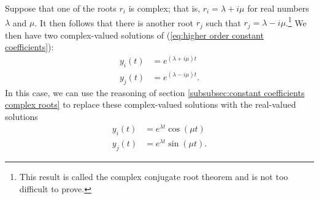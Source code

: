 \documentclass{myart}
\newcommand{\eq}[1]{(\ref{eq:#1})}
\begin{document}
Suppose that one of the roots $r_i$ is complex; that is, $r_i =
\lambda + i \mu$ for real numbers $\lambda$ and $\mu$. It then follows
that there is another root $r_j$ such that $r_j = \lambda - i
\mu$.\footnote{This result is called the complex conjugate root
  theorem and is not too difficult to prove.} We then have two
complex-valued solutions of \eq{higher order constant coefficients}:
\begin{align*}
  y_i(t) &= e^{(\lambda + i \mu)t} \\
  y_j(t) &= e^{(\lambda - i \mu)t}.
\end{align*}
In this case, we can use the reasoning of section
\ref{subsubsec:constant coefficients complex roots} to replace these
complex-valued solutions with the real-valued solutions
\begin{align*}
  y_i(t) &= e^{\lambda t} \cos(\mu t) \\
  y_j(t) &= e^{\lambda t} \sin(\mu t).
\end{align*}
\end{document}
